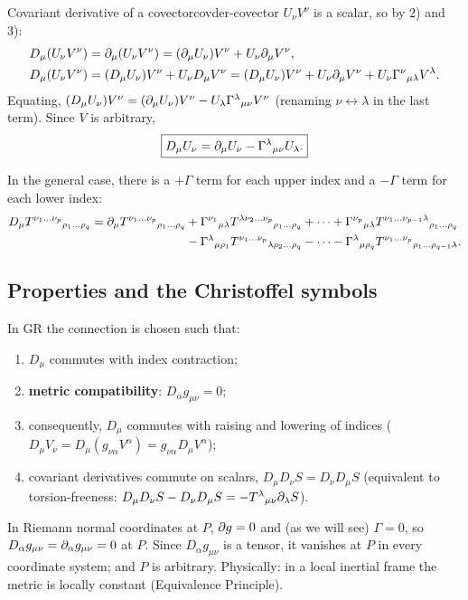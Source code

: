 \begin{example}{Covariant derivative of a covector}{covder-covector}
$U_\nu V^\nu$ is a scalar, so by 2) and 3):
\begin{align*}
  D_\mu(U_\nu V^\nu)&=\partial_\mu(U_\nu V^\nu)=(\partial_\mu U_\nu)V^\nu+U_\nu\partial_\mu V^\nu ,\\
  D_\mu(U_\nu V^\nu)&=(D_\mu U_\nu)V^\nu+U_\nu D_\mu V^\nu=(D_\mu U_\nu)V^\nu+U_\nu\partial_\mu V^\nu+U_\nu\Gamma^{\nu}{}_{\mu\lambda}V^\lambda .
\end{align*}
Equating, $(D_\mu U_\nu)V^\nu=(\partial_\mu U_\nu)V^\nu-U_\lambda\Gamma^{\lambda}{}_{\mu\nu}V^\nu$ (renaming $\nu\leftrightarrow\lambda$ in the last term). Since $V$ is arbitrary,
\begin{equation}
  \boxed{D_\mu U_\nu=\partial_\mu U_\nu-\Gamma^{\lambda}{}_{\mu\nu}U_\lambda .}
\end{equation}
\end{example}
In the general case, there is a $+\Gamma$ term for each upper index and a $-\Gamma$ term for each lower index:
\begin{align}
  D_\mu T^{\nu_1\dots\nu_p}{}_{\rho_1\dots\rho_q}=\partial_\mu T^{\nu_1\dots\nu_p}{}_{\rho_1\dots\rho_q}
  &+\Gamma^{\nu_1}{}_{\mu\lambda}T^{\lambda\nu_2\dots\nu_p}{}_{\rho_1\dots\rho_q}+\dots+\Gamma^{\nu_p}{}_{\mu\lambda}T^{\nu_1\dots\nu_{p-1}\lambda}{}_{\rho_1\dots\rho_q}\nonumber\\
  &-\Gamma^{\lambda}{}_{\mu\rho_1}T^{\nu_1\dots\nu_p}{}_{\lambda\rho_2\dots\rho_q}-\dots-\Gamma^{\lambda}{}_{\mu\rho_q}T^{\nu_1\dots\nu_p}{}_{\rho_1\dots\rho_{q-1}\lambda}.
\end{align}

\subsection{Properties and the Christoffel symbols}

In GR the connection is chosen such that:
\begin{enumerate}[nosep]
\item $D_\mu$ commutes with index contraction;
\item \textbf{metric compatibility}: $\boxed{D_\alpha g_{\mu\nu}=0}$;
\item consequently, $D_\mu$ commutes with raising and lowering of indices ($D_\mu V_\nu=D_\mu(g_{\nu\alpha}V^\alpha)=g_{\nu\alpha}D_\mu V^\alpha$);
\item covariant derivatives commute on scalars, $D_\mu D_\nu S=D_\nu D_\mu S$ (equivalent to torsion-freeness: $D_\mu D_\nu S-D_\nu D_\mu S=-T^\lambda{}_{\mu\nu}\partial_\lambda S$).
\end{enumerate}
\begin{remarkbox}[Why $D_\alpha g_{\mu\nu}=0$?]
In Riemann normal coordinates at $P$, $\partial g=0$ and (as we will see) $\Gamma=0$, so $D_\alpha g_{\mu\nu}=\partial_\alpha g_{\mu\nu}=0$ at $P$. Since $D_\alpha g_{\mu\nu}$ is a tensor, it vanishes at $P$ in every coordinate system; and $P$ is arbitrary. Physically: in a local inertial frame the metric is locally constant (Equivalence Principle).
\end{remarkbox}

